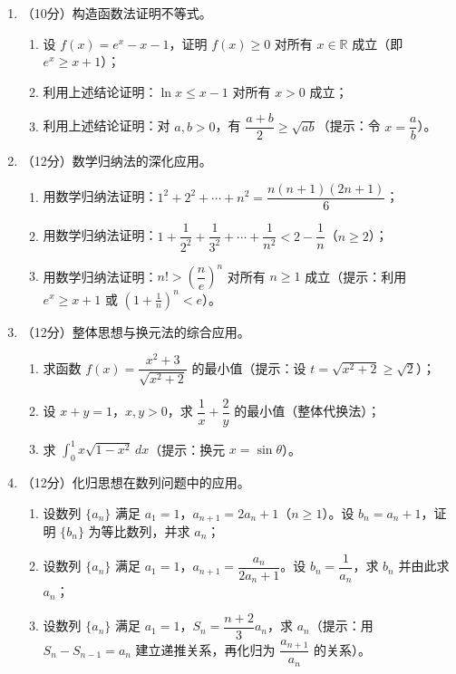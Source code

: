 \documentclass[12pt, a4paper]{ctexart}
\begin{document}
\begin{enumerate}[resume]

\item （10分）构造函数法证明不等式。

\begin{enumerate}[label=(\arabic*)]
    \item 设 $f(x)=e^x-x-1$，证明 $f(x)\geq 0$ 对所有 $x\in\mathbb{R}$ 成立（即 $e^x\geq x+1$）；
    \item 利用上述结论证明：$\ln x\leq x-1$ 对所有 $x>0$ 成立；
    \item 利用上述结论证明：对 $a,b>0$，有 $\dfrac{a+b}{2}\geq \sqrt{ab}$（提示：令 $x=\dfrac{a}{b}$）。
\end{enumerate}

\item （12分）数学归纳法的深化应用。

\begin{enumerate}[label=(\arabic*)]
    \item 用数学归纳法证明：$1^2+2^2+\cdots+n^2=\dfrac{n(n+1)(2n+1)}{6}$；
    \item 用数学归纳法证明：$1+\dfrac{1}{2^2}+\dfrac{1}{3^2}+\cdots+\dfrac{1}{n^2}<2-\dfrac{1}{n}$（$n\geq 2$）；
    \item 用数学归纳法证明：$n!>\left(\dfrac{n}{e}\right)^n$ 对所有 $n\geq 1$ 成立（提示：利用 $e^x\geq x+1$ 或 $(1+\frac{1}{n})^n<e$）。
\end{enumerate}

\item （12分）整体思想与换元法的综合应用。

\begin{enumerate}[label=(\arabic*)]
    \item 求函数 $f(x)=\dfrac{x^2+3}{\sqrt{x^2+2}}$ 的最小值（提示：设 $t=\sqrt{x^2+2}\geq \sqrt{2}$）；
    \item 设 $x+y=1$，$x,y>0$，求 $\dfrac{1}{x}+\dfrac{2}{y}$ 的最小值（整体代换法）；
    \item 求 $\displaystyle\int_0^1 x\sqrt{1-x^2}\,dx$（提示：换元 $x=\sin\theta$）。
\end{enumerate}

\item （12分）化归思想在数列问题中的应用。

\begin{enumerate}[label=(\arabic*)]
    \item 设数列 $\{a_n\}$ 满足 $a_1=1$，$a_{n+1}=2a_n+1$（$n\geq 1$）。设 $b_n=a_n+1$，证明 $\{b_n\}$ 为等比数列，并求 $a_n$；
    \item 设数列 $\{a_n\}$ 满足 $a_1=1$，$a_{n+1}=\dfrac{a_n}{2a_n+1}$。设 $b_n=\dfrac{1}{a_n}$，求 $b_n$ 并由此求 $a_n$；
    \item 设数列 $\{a_n\}$ 满足 $a_1=1$，$S_n=\dfrac{n+2}{3}a_n$，求 $a_n$（提示：用 $S_n-S_{n-1}=a_n$ 建立递推关系，再化归为 $\dfrac{a_{n+1}}{a_n}$ 的关系）。
\end{enumerate}


\end{enumerate}
\end{document}
